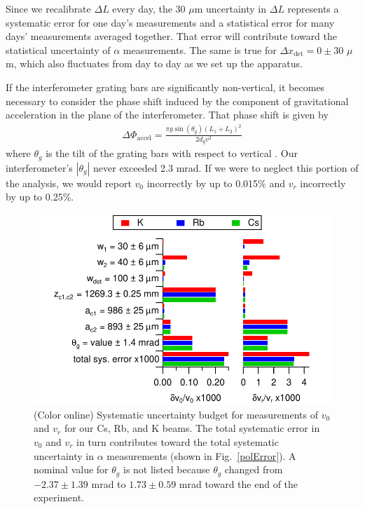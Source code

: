 \documentclass[twocolumn,prl,showpacs,superscriptaddress,longbibliography]{revtex4-1}   %
\newcommand{\figref}[1]{Fig.~\ref{#1}}
\newcommand{\dphiaccel}{\Delta\Phi_{\mathrm{accel}}}
\begin{document}
Since we recalibrate $\Delta L$ every day, the 30 $\mu$m uncertainty in $\Delta L$ represents a systematic error for one day's measurements and a statistical error for many days' measurements averaged together. That error will contribute toward the statistical uncertainty of $\alpha$ measurements.
The same is true for $\Delta x_{\mathrm{det}} = 0 \pm 30$ $\mu$m, which also fluctuates from day to day as we set up the apparatus.

If the interferometer grating bars are significantly non-vertical, it becomes necessary to consider the phase shift induced by the component of gravitational acceleration in the plane of the interferometer. That phase shift is given by
\begin{align}
	\dphiaccel = \frac{\pi g\sin({\theta_g})(L_1+L_2)^2}{2d_g v^2}
	\label{phiAccel}
\end{align}
where $\theta_g$ is the tilt of the grating bars with respect to vertical \cite{Greenberg2014}. 
Our interferometer's $|\theta_g|$ never exceeded 2.3 mrad. If we were to neglect this portion of the analysis, we would report $v_0$ incorrectly by up to 0.015\% and $v_r$ incorrectly by up to 0.25\%.

\begin{figure}
\includegraphics[width=\linewidth,keepaspectratio]{displayVelErrors.pdf}
\caption{\label{velError}(Color online) Systematic uncertainty budget for measurements of $v_0$ and $v_r$ for our Cs, Rb, and K beams. 
The total systematic error in $v_0$ and $v_r$ in turn contributes toward the total systematic uncertainty in $\alpha$ measurements (shown in \figref{polError}).
A nominal value for $\theta_g$ is not listed because $\theta_g$ changed from $-2.37 \pm 1.39$ mrad to $1.73 \pm 0.59$ mrad toward the end of the experiment.}
\end{figure}
\end{document}
